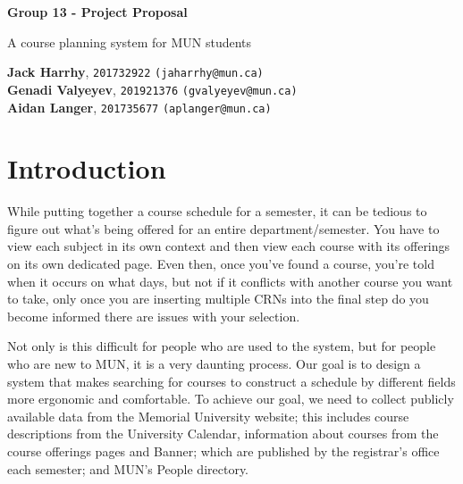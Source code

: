 \documentclass[12pt]{article}
\begin{document}
\begin{titlepage}
    \begin{center}
        \vspace*{1cm}
            
        \Huge
        \textbf{Group 13 - Project Proposal}
            
        \vspace{0.5cm}
        \LARGE
        A course planning system for MUN students
            
        \vspace{1.5cm}
            
        \textbf{Jack Harrhy}, \texttt{201732922} \texttt{(jaharrhy@mun.ca)} \\
        \textbf{Genadi Valyeyev}, \texttt{201921376} \texttt{(gvalyeyev@mun.ca)}\\
        \textbf{Aidan Langer}, \texttt{201735677} \texttt{(aplanger@mun.ca)}\\
            
        \vfill
    \end{center}
\end{titlepage}
\section{Introduction}
While putting together a course schedule for a semester, it can be tedious to figure out what's being offered for an entire department/semester. You have to view each subject in its own context and then view 
each course with its offerings on its own dedicated page. Even then, once you've found a course, you're told when it occurs on what days, but not if it conflicts with another course you want to take, 
only once you are inserting multiple CRNs into the final step do you become informed there are issues with your selection. \par
Not only is this difficult for people who are used to the system, but for people who are new to MUN, it is a very daunting process.  Our goal is to design a system that makes searching for courses to construct a schedule by different fields more ergonomic and comfortable. To achieve our goal, we need to collect publicly available data from the 
Memorial University website; this includes course descriptions from the University Calendar, information about courses from the course offerings pages and Banner; which are published by the registrar's office each semester; and MUN's People directory.
\end{document}
